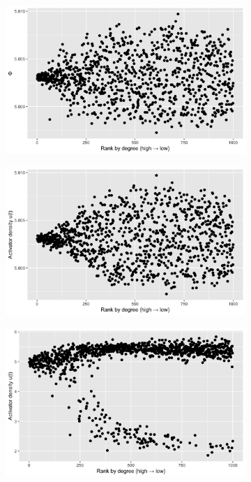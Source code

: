 \begin{figure}[H] %
  \centering
  \begin{subfigure}{0.48\textwidth}
    \centering
    \includegraphics[width=\linewidth]{Graphs/Phi_vs_index.png}
    \caption{}
  \end{subfigure}\hfill
  \begin{subfigure}{0.48\textwidth}
    \centering
    \includegraphics[width=\linewidth]{Graphs/Activator_density_vs_index_t = 200.png}
    \caption{}
  \end{subfigure}

  \vspace{0.6em}

  \begin{subfigure}{0.48\textwidth}
    \centering
    \includegraphics[width=\linewidth]{Graphs/Activator_denisty_vs_index_t=10000.png}
    \caption{}
  \end{subfigure}\hfill
 

\end{figure}
